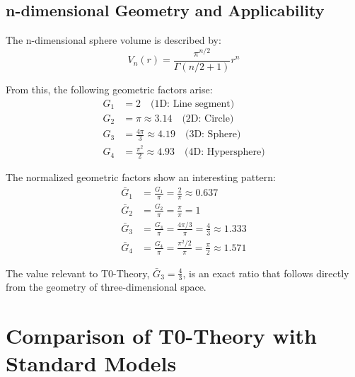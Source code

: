 \documentclass[12pt,a4paper]{article}
\theoremstyle{definition}
\begin{document}
	\subsection{n-dimensional Geometry and Applicability}
	
	The n-dimensional sphere volume is described by:
	\begin{equation}
		V_n(r) = \frac{\pi^{n/2}}{\Gamma(n/2 + 1)} r^n
	\end{equation}
	
	From this, the following geometric factors arise:
	\begin{align}
		G_1 &= 2 \quad \text{(1D: Line segment)}\\
		G_2 &= \pi \approx 3.14 \quad \text{(2D: Circle)}\\
		G_3 &= \frac{4\pi}{3} \approx 4.19 \quad \text{(3D: Sphere)}\\
		G_4 &= \frac{\pi^2}{2} \approx 4.93 \quad \text{(4D: Hypersphere)}
	\end{align}
	
	\begin{verhaltnis}
		The normalized geometric factors show an interesting pattern:
		\begin{align}
			\bar{G}_1 &= \frac{G_1}{\pi} = \frac{2}{\pi} \approx 0.637\\
			\bar{G}_2 &= \frac{G_2}{\pi} = \frac{\pi}{\pi} = 1\\
			\bar{G}_3 &= \frac{G_3}{\pi} = \frac{4\pi/3}{\pi} = \frac{4}{3} \approx 1.333\\
			\bar{G}_4 &= \frac{G_4}{\pi} = \frac{\pi^2/2}{\pi} = \frac{\pi}{2} \approx 1.571
		\end{align}
		
		The value relevant to T0-Theory, $\bar{G}_3 = \frac{4}{3}$, is an exact ratio that follows directly from the geometry of three-dimensional space.
	\end{verhaltnis}
	
	\section{Comparison of T0-Theory with Standard Models}
	
\end{document}

